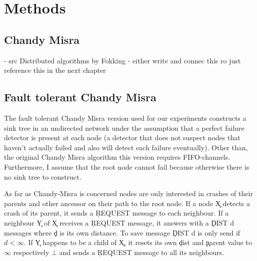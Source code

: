 \section{Methods}  %

\subsection{Chandy Misra}
 - src Distributed algorithms by Fokking
 - either write and connec this ro just reference this in the next chapter
\subsection {Fault tolerant Chandy Misra}
  The fault tolerant Chandy Misra version used for our experiments constructs a sink tree in an undirected network under the assumption that a perfect failure detector is present at each node (a detector that does not suspect nodes that haven't actually failed and also will detect each failure eventually). 
  Other than, the original Chandy Misra algorithm this version requires FIFO-channels.
  Furthermore, I assume that the root node cannot fail because otherwise there is no sink tree to construct.
  
  As far as Chandy-Misra is concerned nodes are only interested in crashes of their parents and other ancessor on their path to the root node.
  If a node \c{X} detects a crash of its parent, it sends a \c{REQUEST} message to each neighbour. 
  If a neighbour \c{Y} of \c{X} receives a \c{REQUEST} message, it answers with a \c{DIST d} messages where \c{d} is its own distance. 
  To save message \c{DIST d} is only send if $d < \infty $.
  If \c{Y} happens to be a child of \c{X}, it resets its own \c{dist} and \c{parent} value to $\infty$ respectively $\bot$ and sends a \c{REQUEST} message to all its neighbours.
  
